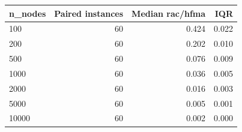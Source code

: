 \begin{tabular}{lrrr}
\toprule
n\_nodes & Paired instances & Median rac/hfma & IQR \\
\midrule
100 & 60 & 0.424 & 0.022 \\
200 & 60 & 0.202 & 0.010 \\
500 & 60 & 0.076 & 0.009 \\
1000 & 60 & 0.036 & 0.005 \\
2000 & 60 & 0.016 & 0.003 \\
5000 & 60 & 0.005 & 0.001 \\
10000 & 60 & 0.002 & 0.000 \\
\bottomrule
\end{tabular}

